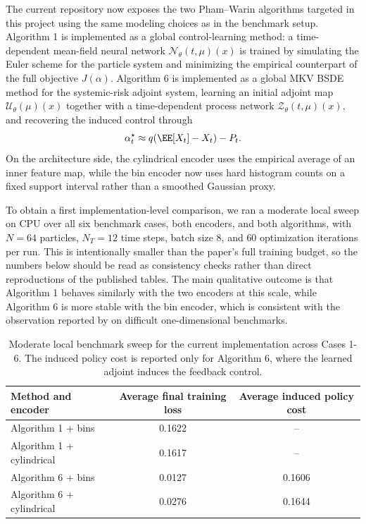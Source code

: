 \documentclass[11pt]{article}
\begin{document}
The current repository now exposes the two Pham--Warin algorithms targeted in this project using the same modeling choices as in the benchmark setup. Algorithm 1 is implemented as a global control-learning method: a time-dependent mean-field neural network $\mathcal{N}_\theta(t,\mu)(x)$ is trained by simulating the Euler scheme for the particle system and minimizing the empirical counterpart of the full objective $J(\alpha)$. Algorithm 6 is implemented as a global MKV BSDE method for the systemic-risk adjoint system, learning an initial adjoint map $\mathcal{U}_\theta(\mu)(x)$ together with a time-dependent process network $\mathcal{Z}_\theta(t,\mu)(x)$, and recovering the induced control through
\[
  \alpha_t^\star \approx q(\EE[X_t] - X_t) - P_t.
\]
On the architecture side, the cylindrical encoder uses the empirical average of an inner feature map, while the bin encoder now uses hard histogram counts on a fixed support interval rather than a smoothed Gaussian proxy.

To obtain a first implementation-level comparison, we ran a moderate local sweep on CPU over all six benchmark cases, both encoders, and both algorithms, with $N = 64$ particles, $N_T = 12$ time steps, batch size $8$, and $60$ optimization iterations per run. This is intentionally smaller than the paper's full training budget, so the numbers below should be read as consistency checks rather than direct reproductions of the published tables. The main qualitative outcome is that Algorithm 1 behaves similarly with the two encoders at this scale, while Algorithm 6 is more stable with the bin encoder, which is consistent with the observation reported by \citet{pham2024mfnn} on difficult one-dimensional benchmarks.

\begin{table}[H]
  \centering
  \begin{tabular}{lcc}
    \toprule
    Method and encoder & Average final training loss & Average induced policy cost \\
    \midrule
    Algorithm 1 + bins & 0.1622 & -- \\
    Algorithm 1 + cylindrical & 0.1617 & -- \\
    Algorithm 6 + bins & 0.0127 & 0.1606 \\
    Algorithm 6 + cylindrical & 0.0276 & 0.1644 \\
    \bottomrule
  \end{tabular}
  \caption{Moderate local benchmark sweep for the current implementation across Cases 1-6. The induced policy cost is reported only for Algorithm 6, where the learned adjoint induces the feedback control.}
  \label{tab:systemic-preliminary-sweep}
\end{table}
\end{document}
